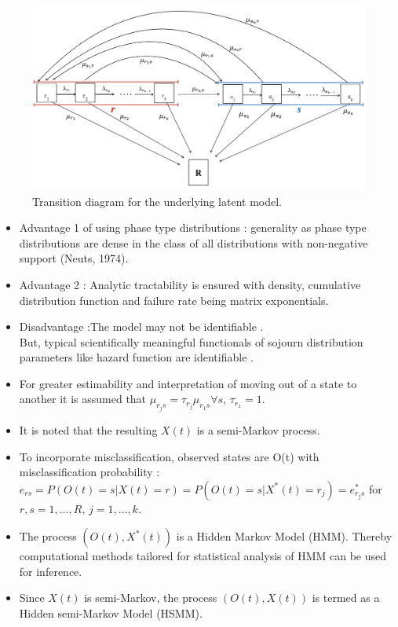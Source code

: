 \documentclass{beamer}
\begin{document}
\begin{frame}
\begin{figure}
\includegraphics[scale=0.4]{coxmodelstitched2.png}
\caption{Transition diagram for the underlying latent model.}
\end{figure}
\end{frame}
\begin{frame}
\begin{itemize}
\item Advantage 1 of using phase type distributions :  generality as phase type distributions are dense in the class of all distributions with non-negative support (Neuts, 1974). 
\item Advantage 2 : Analytic tractability is ensured with density, cumulative distribution function and failure rate being matrix exponentials.
\item Disadvantage :The model may not be identifiable \citep{asmussen1996fitting}. \\ \vspace{2mm}But, typical scientifically meaningful functionals of sojourn distribution parameters like hazard function are identifiable \citep{bladt2003estimation}.
\end{itemize}
\end{frame}
\begin{frame}
\begin{itemize}
\item For greater estimability and interpretation of moving out of a state to another it is assumed that $\mu_{r_j s} = \tau_{r_j} \mu_{r_1 s} \forall s$, $\tau_{r_1}=1$. %
\item It is noted that the resulting $X(t)$ is a semi-Markov process.
\item To incorporate misclassification, observed states are O(t) with misclassification probability : $e_{rs}=P(O(t)=s|X(t) =r)=P(O(t)=s|X^* (t) =r_j)= e^*_{r_j s}$ for $r,s = 1,\ldots,R$, $j=1,\ldots, k$. 
\item The process $(O(t), X^*(t))$ is a Hidden Markov Model (HMM). Thereby computational methods tailored for statistical analysis of HMM can be used for inference.
\item Since $X(t)$ is semi-Markov, the process $(O(t),X(t))$ is termed as a Hidden semi-Markov Model (HSMM).

\end{itemize}
\end{frame}
\end{document}
